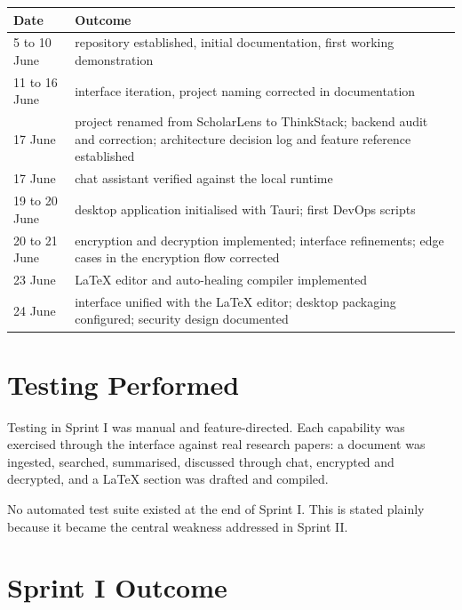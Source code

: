 \documentclass[11pt,a4paper]{article}
\begin{document}
\begin{center}
\small
\begin{tabularx}{\linewidth}{@{}lX@{}}
\toprule
\textbf{Date} & \textbf{Outcome} \\
\midrule
5 to 10 June & repository established, initial documentation, first working demonstration \\
11 to 16 June & interface iteration, project naming corrected in documentation \\
17 June & project renamed from ScholarLens to ThinkStack; backend audit and correction; architecture decision log and feature reference established \\
17 June & chat assistant verified against the local runtime \\
19 to 20 June & desktop application initialised with Tauri; first DevOps scripts \\
20 to 21 June & encryption and decryption implemented; interface refinements; edge cases in the encryption flow corrected \\
23 June & LaTeX editor and auto-healing compiler implemented \\
24 June & interface unified with the LaTeX editor; desktop packaging configured; security design documented \\
\bottomrule
\end{tabularx}
\end{center}

\section{Testing Performed}

Testing in Sprint I was manual and feature-directed. Each capability was
exercised through the interface against real research papers: a document was
ingested, searched, summarised, discussed through chat, encrypted and
decrypted, and a LaTeX section was drafted and compiled.

No automated test suite existed at the end of Sprint I. This is stated plainly
because it became the central weakness addressed in Sprint II.

\section{Sprint I Outcome}
\end{document}
